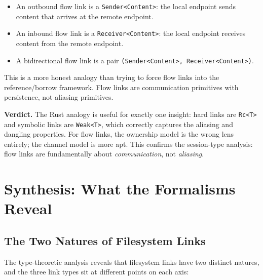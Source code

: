 \documentclass[11pt]{article}
\begin{document}
\begin{itemize}
  \item An outbound flow link is a \texttt{Sender<Content>}: the local
    endpoint sends content that arrives at the remote endpoint.
  \item An inbound flow link is a \texttt{Receiver<Content>}: the local
    endpoint receives content from the remote endpoint.
  \item A bidirectional flow link is a pair
    \texttt{(Sender<Content>, Receiver<Content>)}.
\end{itemize}

This is a more honest analogy than trying to force flow links into the
reference/borrow framework. Flow links are communication primitives with
persistence, not aliasing primitives.

\textbf{Verdict.} The Rust analogy is useful for exactly one insight: hard
links are \texttt{Rc<T>} and symbolic links are \texttt{Weak<T>}, which
correctly captures the aliasing and dangling properties. For flow links, the
ownership model is the wrong lens entirely; the channel model is more apt.
This confirms the session-type analysis: flow links are fundamentally about
\emph{communication}, not \emph{aliasing}.


\section{Synthesis: What the Formalisms Reveal}\label{sec:synthesis}

\subsection{The Two Natures of Filesystem Links}

The type-theoretic analysis reveals that filesystem links have two distinct
natures, and the three link types sit at different points on each axis:
\end{document}
